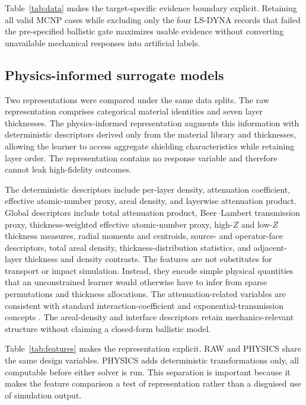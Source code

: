 \documentclass[12pt]{elsarticle}
\begin{document}
	Table~\ref{tab:data} makes the target-specific evidence boundary explicit. Retaining all valid MCNP cases while excluding only the four LS-DYNA records that failed the pre-specified ballistic gate maximizes usable evidence without converting unavailable mechanical responses into artificial labels.
	
	\subsection{Physics-informed surrogate models}
	
	Two representations were compared under the same data splits. The raw representation comprises categorical material identities and seven layer thicknesses. The physics-informed representation augments this information with deterministic descriptors derived only from the material library and thicknesses, allowing the learner to access aggregate shielding characteristics while retaining layer order. The representation contains no response variable and therefore cannot leak high-fidelity outcomes.
	
	The deterministic descriptors include per-layer density, attenuation coefficient, effective atomic-number proxy, areal density, and layerwise attenuation product. Global descriptors include total attenuation product, Beer--Lambert transmission proxy, thickness-weighted effective atomic-number proxy, high-$Z$ and low-$Z$ thickness measures, radial moments and centroids, source- and operator-face descriptors, total areal density, thickness-distribution statistics, and adjacent-layer thickness and density contrasts. The features are not substitutes for transport or impact simulation. Instead, they encode simple physical quantities that an unconstrained learner would otherwise have to infer from sparse permutations and thickness allocations. The attenuation-related variables are consistent with standard interaction-coefficient and exponential-transmission concepts \cite{Attix1986,Knoll2010,NISTXCOM}. The areal-density and interface descriptors retain mechanics-relevant structure without claiming a closed-form ballistic model.

	Table~\ref{tab:features} makes the representation explicit. RAW and PHYSICS share the same design variables. PHYSICS adds deterministic transformations only, all computable before either solver is run. This separation is important because it makes the feature comparison a test of representation rather than a disguised use of simulation output.
\end{document}
